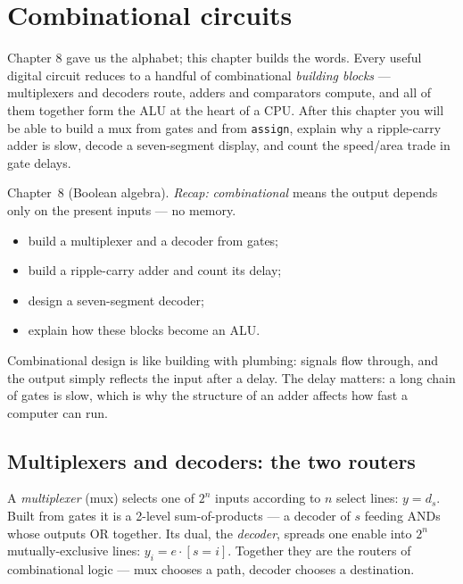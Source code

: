 \chapter{Combinational circuits}
\label{ch:comb}

Chapter 8 gave us the alphabet; this chapter builds the words.
Every useful digital circuit reduces to a handful of combinational
\emph{building blocks} — multiplexers and
decoders route, adders and comparators compute, and all of them together
form the ALU at the heart of a CPU. After this chapter you will be able
to build a mux from gates and from \texttt{assign}, explain why a
ripple-carry adder is slow, decode a seven-segment display, and count
the speed/area trade in gate delays.

\begin{rulebox}
Chapter~8 (Boolean algebra). \emph{Recap:} \emph{combinational} means the output depends only on the present inputs --- no memory.
\end{rulebox}
\begin{wins}
\begin{itemize}
\item build a multiplexer and a decoder from gates;
\item build a ripple-carry adder and count its delay;
\item design a seven-segment decoder;
\item explain how these blocks become an ALU.
\end{itemize}
\end{wins}
\begin{principle}
Combinational design is like building with plumbing: signals flow through, and the output simply reflects the input after a delay. The delay matters: a long chain of gates is slow, which is why the structure of an adder affects how fast a computer can run.
\end{principle}

\section{Multiplexers and decoders: the two routers}
\label{sec:routers}

A \emph{multiplexer} (mux) selects one of $2^n$ inputs
according to $n$ select lines: $y = d_{s}$. Built from gates it is a
2-level sum-of-products — a decoder of $s$ feeding ANDs whose outputs
OR together. Its dual, the \emph{decoder}, spreads one
enable into $2^n$ mutually-exclusive lines: $y_i = e \cdot [s=i]$.
Together they are the routers of combinational logic — mux chooses a
path, decoder chooses a destination.

